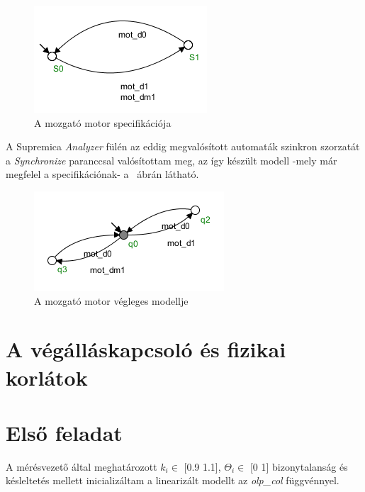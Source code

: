 \begin{figure}
	\centering
	\includegraphics[keepaspectratio]{figures/2m03/b_spec_motor.png}
	\caption{A mozgató motor specifikációja}
	\label{fig:SpecMot}
\end{figure}
A Supremica \textit{Analyzer} fülén az eddig megvalósított automaták szinkron szorzatát a \textit{Synchronize} paranccsal valósítottam meg, az így készült modell -mely már megfelel a specifikációnak- a ~ábrán látható.
\begin{figure}
	\centering
	\includegraphics[keepaspectratio]{figures/2m03/b_supmot.png}
	\caption{A mozgató motor végleges modellje}
	\label{fig:SupMot}
\end{figure}



\section{A végálláskapcsoló és fizikai korlátok}













\newpage
\section{Első feladat}
A mérésvezető által meghatározott {$k_i \in$ [0.9 1.1], $\Theta_i \in$ [0 1]} bizonytalanság és késleltetés mellett inicializáltam a linearizált modellt az \textit{olp\_col} függvénnyel. 

